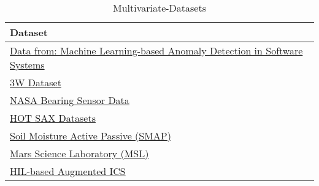 \begin{table}[h]\centering
        \begin{tabular}{l}
            Dataset                                                                                                                             \\\midrule
            \href{https://www.kaggle.com/anomalydetectionml/features}{Data from: Machine Learning-based Anomaly Detection in Software Systems}  \\\addlinespace
            \href{https://github.com/ricardovvargas/3w_dataset}{3W Dataset}                                                                     \\\addlinespace
            \href{https://www.kaggle.com/rkuo2000/nasa-bearing-sensor-data/notebooks}{NASA Bearing Sensor Data}                                 \\\addlinespace
            \href{https://github.com/chickenbestlover/RNN-Time-series-Anomaly-Detection}{HOT SAX Datasets}                                      \\\addlinespace
            \href{https://github.com/khundman/telemanom}{Soil Moisture Active Passive (SMAP)}                                                   \\\addlinespace
            \href{https://github.com/khundman/telemanom}{Mars Science Laboratory  (MSL)}                                                        \\\addlinespace
            \href{https://www.kaggle.com/icsdataset/hai-security-dataset}{HIL-based Augmented ICS}                                              \\
        \end{tabular}
        \caption{Multivariate-Datasets}\label{tab:multivariate-datasets}
\end{table}\clearpage


